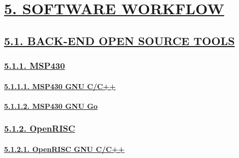 \documentclass[
]{article}
\begin{document}
\hypertarget{software-workflow}{%
\section{\texorpdfstring{\protect\hyperlink{software-workflow-1}{5.
SOFTWARE WORKFLOW}}{5. SOFTWARE WORKFLOW}}\label{software-workflow}}

\hypertarget{back-end-open-source-tools-1}{%
\subsection{\texorpdfstring{\protect\hyperlink{back-end-open-source-tools-3}{5.1.
BACK-END OPEN SOURCE
TOOLS}}{5.1. BACK-END OPEN SOURCE TOOLS}}\label{back-end-open-source-tools-1}}

\hypertarget{msp430-1}{%
\subsubsection{\texorpdfstring{\protect\hyperlink{msp430-4}{5.1.1.
MSP430}}{5.1.1. MSP430}}\label{msp430-1}}

\hypertarget{msp430-gnu-cc}{%
\paragraph{\texorpdfstring{\protect\hyperlink{msp430-gnu-cc-1}{5.1.1.1.
MSP430 GNU C/C++}}{5.1.1.1. MSP430 GNU C/C++}}\label{msp430-gnu-cc}}

\hypertarget{msp430-gnu-go}{%
\paragraph{\texorpdfstring{\protect\hyperlink{msp430-gnu-go-1}{5.1.1.2.
MSP430 GNU Go}}{5.1.1.2. MSP430 GNU Go}}\label{msp430-gnu-go}}

\hypertarget{openrisc-1}{%
\subsubsection{\texorpdfstring{\protect\hyperlink{openrisc-4}{5.1.2.
OpenRISC}}{5.1.2. OpenRISC}}\label{openrisc-1}}

\hypertarget{openrisc-gnu-cc}{%
\paragraph{\texorpdfstring{\protect\hyperlink{openrisc-gnu-cc-1}{5.1.2.1.
OpenRISC GNU
C/C++}}{5.1.2.1. OpenRISC GNU C/C++}}\label{openrisc-gnu-cc}}
\end{document}
